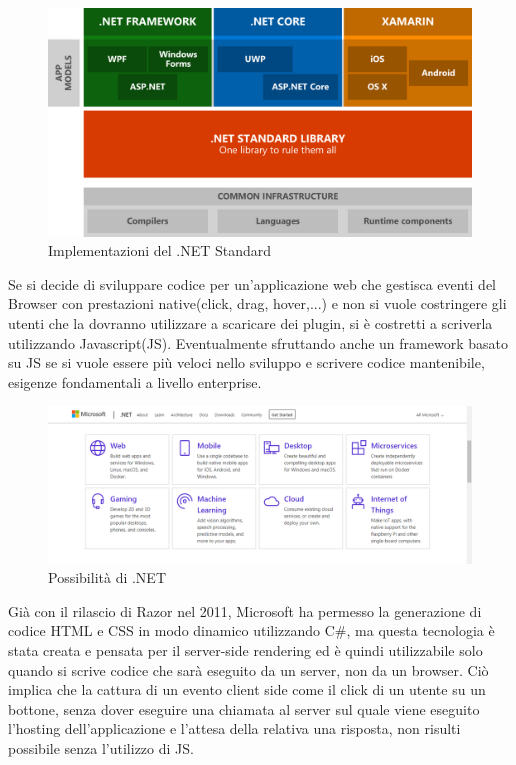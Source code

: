 \begin{figure}[H]
	\centerline{\includegraphics[scale=0.2]{figure/DotNetImplementations}}
	\caption{Implementazioni del .NET Standard}
	\label{fig:DotNetImplementations}
\end{figure}

Se si decide di sviluppare codice per un'applicazione web che gestisca eventi del Browser con prestazioni native(click, drag, hover,...) e non si vuole costringere gli utenti che la dovranno utilizzare a scaricare dei plugin, si \`e costretti a scriverla utilizzando Javascript(JS).
Eventualmente sfruttando anche un framework basato su JS se si vuole essere pi\`u veloci nello sviluppo e scrivere codice mantenibile, esigenze fondamentali a livello enterprise.

\begin{figure}[H]
\centerline{\includegraphics[scale=0.35]{figure/DotNetFrameworkCapabilities}}
\caption{Possibilit\`a di .NET}
\label{fig:DotNetCapabilities}
\end{figure}

Gi\`a con il rilascio di Razor\cite{razor} nel 2011, Microsoft ha permesso la generazione di codice HTML e CSS in modo dinamico utilizzando C\#, ma questa tecnologia \`e stata creata e pensata per il server-side rendering ed \`e quindi utilizzabile solo quando si scrive codice che sar\`a eseguito da un server, non da un browser.
Ci\`o implica che la cattura di un evento client side come il click di un utente su un bottone, senza dover eseguire una chiamata al server sul quale viene eseguito l'hosting dell'applicazione e l'attesa della relativa una risposta, non risulti possibile senza l'utilizzo di JS.

